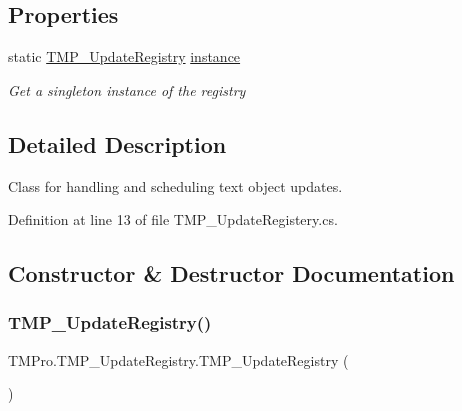 \subsection*{Properties}
\begin{DoxyCompactItemize}
\item 
static \mbox{\hyperlink{class_t_m_pro_1_1_t_m_p___update_registry}{T\+M\+P\+\_\+\+Update\+Registry}} \mbox{\hyperlink{class_t_m_pro_1_1_t_m_p___update_registry_a4b7cc4e0c23baf71b6925bad7d8aca97}{instance}}
\begin{DoxyCompactList}\small\item\em Get a singleton instance of the registry \end{DoxyCompactList}\end{DoxyCompactItemize}


\subsection{Detailed Description}
Class for handling and scheduling text object updates. 



Definition at line 13 of file T\+M\+P\+\_\+\+Update\+Registery.\+cs.



\subsection{Constructor \& Destructor Documentation}
\mbox{\label{class_t_m_pro_1_1_t_m_p___update_registry_ace9d173b85d91abac839f7fb70b73b9f}} 
\subsubsection{\texorpdfstring{TMP\_UpdateRegistry()}{TMP\_UpdateRegistry()}}
{\footnotesize\ttfamily T\+M\+Pro.\+T\+M\+P\+\_\+\+Update\+Registry.\+T\+M\+P\+\_\+\+Update\+Registry (\begin{DoxyParamCaption}{ }\end{DoxyParamCaption})\hspace{0.3cm}{\ttfamily [protected]}}



